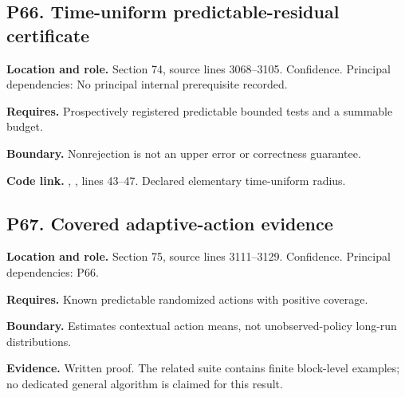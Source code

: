 \documentclass[11pt,oneside,openany]{book}
\numberwithin{equation}{section}
\begin{document}
\par\noindent\begin{minipage}{\textwidth}
\subsection{P66. Time-uniform predictable-residual
certificate}\label{LSMRegister:p66.-time-uniform-predictable-residual-certificate}

\textbf{Location and role.} Section 74, source lines 3068--3105.
Confidence. Principal dependencies: No principal internal prerequisite
recorded.

\textbf{Requires.} Prospectively registered predictable bounded tests
and a summable budget.

\textbf{Boundary.} Nonrejection is not an upper error or correctness
guarantee.

\textbf{Code link.} ,
, lines 43--47. Declared elementary time-uniform
radius.
\end{minipage}\par\medskip

\par\noindent\begin{minipage}{\textwidth}
\subsection{P67. Covered adaptive-action
evidence}\label{LSMRegister:p67.-covered-adaptive-action-evidence}

\textbf{Location and role.} Section 75, source lines 3111--3129.
Confidence. Principal dependencies: P66.

\textbf{Requires.} Known predictable randomized actions with positive
coverage.

\textbf{Boundary.} Estimates contextual action means, not
unobserved-policy long-run distributions.

\textbf{Evidence.} Written proof. The related suite contains finite
block-level examples; no dedicated general algorithm is claimed for this
result.
\end{minipage}\par\medskip
\end{document}
